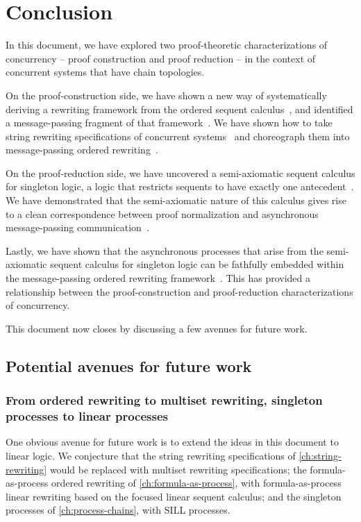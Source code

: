 \chapter{Conclusion}\label{ch:conclusion}

In this document, we have explored two proof-theoretic characterizations of concurrency -- proof construction and proof reduction -- in the context of concurrent systems that have chain topologies.

On the proof-construction side, we have shown a new way of systematically deriving a rewriting framework from the ordered sequent calculus~, and identified a message-passing fragment of that framework~.
We have shown how to take string rewriting specifications of concurrent systems~ and choreograph them into message-passing ordered rewriting~.

On the proof-reduction side, we have uncovered a semi-axiomatic sequent calculus for singleton logic, a logic that restricts sequents to have exactly one antecedent~.
We have demonstrated that the semi-axiomatic nature of this calculus gives rise to a clean correspondence between proof normalization and asynchronous message-passing communication~.

Lastly, we have shown that the asynchronous processes that arise from the semi-axiomatic sequent calculus for singleton logic can be fathfully embedded within the message-passing ordered rewriting framework~.
This has provided a relationship between the proof-construction and proof-reduction characterizations of concurrency.

This document now closes by discussing a few avenues for future work.

\section{Potential avenues for future work}\label{sec:conclusion:nondeterminism}

\subsection{From ordered rewriting to multiset rewriting, singleton processes to linear processes}

One obvious avenue for future work is to extend the ideas in this document to linear logic.
We conjecture that the string rewriting specifications of \cref{ch:string-rewriting} would be replaced with multiset rewriting specifications\autocite{Meseguer:TCS92}; the formula-as-process ordered rewriting of \cref{ch:formula-as-process}, with formula-as-process linear rewriting based on the focused linear sequent calculus\autocites{Miller:ELP92}{Cervesato+Scedrov:IC09}; and the singleton processes of \cref{ch:process-chains}, with \acs{SILL} processes\autocite{Caires+:MSCS16}.

